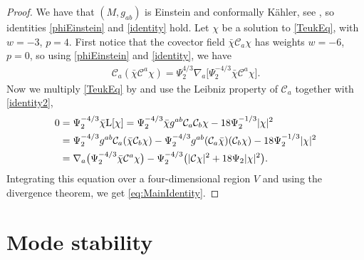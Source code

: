 \documentclass[pdftex]{sigma}
\numberwithin{equation}{section}
\begin{document}
\begin{proof}
We have that $(M,g_{ab})$ is Einstein and conformally K\"ahler, see \cite{MR707181}, so identities \eqref{phiEinstein} and \eqref{identity} hold.
Let $\chi$ be a solution to \eqref{TeukEq}, with $w=-3$, $p=4$.
First notice that the covector field $\bar\chi\mathcal{C}_{a}\chi$ has weights $w=-6$, $p=0$, so using \eqref{phiEinstein} and \eqref{identity}, we have
\begin{align} \label{identity2}
\mathcal{C}_{a}(\bar\chi\mathcal{C}^{a}\chi) = \Psi_{2}^{4/3}\nabla_{a}\bigl[\Psi_{2}^{-4/3}\bar\chi\mathcal{C}^{a}\chi\bigr].
\end{align}
Now we multiply \eqref{TeukEq} by  and use the Leibniz property of $\mathcal{C}_{a}$ together with \eqref{identity2},
\begin{align*}
 0 ={}& \Psi_{2}^{-4/3}\bar\chi{\rm L}[\chi]
 =  \Psi_{2}^{-4/3}\bar\chi g^{ab}\mathcal{C}_{a}\mathcal{C}_{b}\chi - 18\Psi_{2}^{-1/3}|\chi|^2 \\
 ={}& \Psi_{2}^{-4/3}g^{ab}\mathcal{C}_{a}(\bar\chi \mathcal{C}_{b}\chi) - \Psi_{2}^{-4/3}g^{ab}(\mathcal{C}_{a}\bar\chi)(\mathcal{C}_{b}\chi) - 18\Psi_{2}^{-1/3}|\chi|^2 \\
 ={}& \nabla_{a}\bigl(\Psi_{2}^{-4/3}\bar\chi \mathcal{C}^{a}\chi\bigr) - \Psi_{2}^{-4/3}\bigl(|\mathcal{C}\chi|^{2} + 18\Psi_{2}|\chi|^2\bigr).
\end{align*}
Integrating this equation over a four-dimensional region $V$ and using the divergence theorem, we get \eqref{eq:MainIdentity}.
\end{proof}

\section{Mode stability}
\label{sec:modestability}
\end{document}
